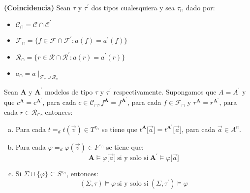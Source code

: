   \begin{lemma}
    \PN \textbf{(Coincidencia)} Sean $\tau$ y $\tau^{\prime}$ dos tipos cualesquiera y sea $\tau_{\cap}$ dado por:
    \begin{itemize}
      \item $\mathcal{C}_{\cap} = \mathcal{C} \cap \mathcal{C}^{\prime}$
      \item $\mathcal{F}_{\cap} = \{f \in \mathcal{F} \cap \mathcal{F}^{\prime}: a(f) = a^{\prime}(f)\}$
      \item $\mathcal{R}_{\cap} = \{r \in \mathcal{R} \cap \mathcal{R}^{\prime}: a(r) = a^{\prime}(r)\}$
      \item $a_{\cap} = a\mid_{\mathcal{F}_{\cap} \cup \mathcal{R}_{\cap}}$
    \end{itemize}

    \PN Sean $\mathbf{A}$ y $\mathbf{A}^{\prime}$ modelos de tipo $\tau$ y $\tau^{\prime}$ respectivamente. Supongamos
    que $A = A^{\prime}$ y que $c^{\mathbf{A}} = c^{\mathbf{A}^{\prime}}$, para cada $c \in \mathcal{C}_{\cap},
    f^{\mathbf{A}} = f^{\mathbf{A}^{\prime}}$, para cada $f \in \mathcal{F}_{\cap}$ y $r^{\mathbf{A}} =
    r^{\mathbf{A}^{\prime}}$, para cada $r \in \mathcal{R}_{\cap}$, entonces:
    \begin{enumerate}[(a)]
      \item Para cada $t =_{d} t(\vec{v}) \in T^{\tau_{\cap}}$ se tiene que $t^{\mathbf{A}} \lbrack \vec{a} \rbrack =
      t^{\mathbf{A}^{\prime}} \lbrack \vec{a} \rbrack$, para cada $\vec{a} \in A^{n}$.
      \item Para cada $\varphi =_{d} \varphi (\vec{v}) \in F^{\tau_{\cap}}$ se tiene que:
      \[
        \mathbf{A} \models \varphi \lbrack \vec{a} \rbrack \ \text{si y solo si} \ \mathbf{A}^{\prime} \models \varphi
        \lbrack \vec{a} \rbrack
      \]
      \item Si $\Sigma \cup \{\varphi\} \subseteq S^{\tau_{\cap}}$, entonces:
      \[
        (\Sigma, \tau) \models \varphi \ \text{si y solo si} \ (\Sigma, \tau^{\prime}) \models \varphi
      \]
    \end{enumerate}
  \end{lemma}
